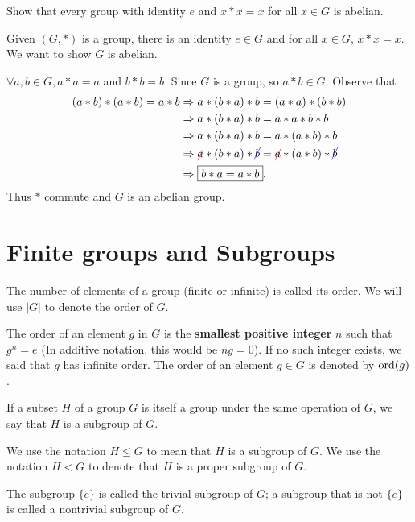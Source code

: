 \begin{example}[Tutorial]
    Show that every group with identity $e$ and $x * x = x$ for all $x \in G$ is abelian.
\end{example}
\begin{solution}
    Given $(G, *)$ is a group, there is an identity $e \in G$ and for all $x \in G$, $x * x = x$. We 
    want to show $G$ is abelian.

    $\forall a, b \in G, a * a = a$ and $b * b = b$. Since $G$ is a group, so $a * b \in G$. Observe that
    \begin{align*}
        (a * b) * (a * b) = a * b &\Rightarrow a * (b * a) * b = (a * a) * (b * b)\\
        &\Rightarrow a * (b * a) * b = a * a * b * b\\
        &\Rightarrow a * (b * a) * b = a * (a * b) * b\\
        &\Rightarrow \Cancel[red]{a} * (b * a) * \Cancel[blue]{b} = \Cancel[red]{a} * (a * b) * \Cancel[blue]{b}\\
        &\Rightarrow \fbox{$b * a = a * b$}.
    \end{align*}
    Thus $*$ commute and $G$ is an abelian group.
\end{solution}

\section{Finite groups and Subgroups}

\begin{definition}
    The number of elements of a group (finite or infinite) is called its order. We 
    will use $|G|$ to denote the order of $G$.
\end{definition}

The order of an element $g$ in $G$ is the \textbf{smallest positive integer} $n$ such that 
$g^n = e$ (In additive notation, this would be $ng = 0$). If no such integer exists, we said that 
$g$ has infinite order. The order of an element $g \in G$ is denoted 
by $\ord(g)$.

\begin{definition}[Subgroups]
    If a subset $H$ of a group $G$ is itself a group under the same operation of $G$, we say that $H$ is a subgroup of $G$.
\end{definition}

\begin{remark}
    We use the notation $H \leq G$ to mean that $H$ is a subgroup of $G$. We use the notation $H < G$ to denote that 
$H$ is a proper subgroup of $G$. 

The subgroup $\{ e \}$ is called the trivial subgroup of $G$; a subgroup that is not 
$\{ e \}$ is called a nontrivial subgroup of $G$.
\end{remark}

